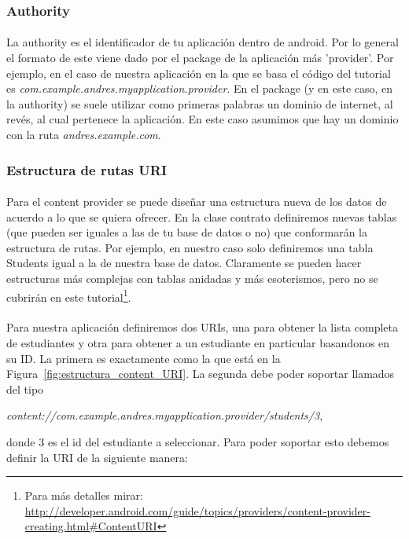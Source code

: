 \documentclass[10pt]{extarticle}
\begin{document}
\subsubsection{Authority}

\paragraph{}
La authority es el identificador de tu aplicación dentro de android. Por lo general el formato de este viene dado por el package de la aplicación más 'provider'. Por ejemplo, en el caso de nuestra aplicación en la que se basa el código del tutorial es \textit{com.example.andres.myapplication.provider}. En el package (y en este caso, en la authority) se suele utilizar como primeras palabras un dominio de internet, al revés, al cual pertenece la aplicación. En este caso asumimos que hay un dominio con la ruta \textit{andres.example.com}.

\subsubsection{Estructura de rutas URI}

\paragraph{}
Para el content provider se puede diseñar una estructura nueva de los datos de acuerdo a lo que se quiera ofrecer. En la clase contrato definiremos nuevas tablas (que pueden ser iguales a las de tu base de datos o no) que conformarán la estructura de rutas. Por ejemplo, en nuestro caso solo definiremos una tabla Students igual a la de nuestra base de datos. Claramente se pueden hacer estructuras más complejas con tablas anidadas y más esoterismos, pero no se cubrirán en este tutorial\footnote{Para más detalles mirar: \url{http://developer.android.com/guide/topics/providers/content-provider-creating.html\#ContentURI}}.

\paragraph{}
Para nuestra aplicación definiremos dos URIs, una para obtener la lista completa de estudiantes y otra para obtener a un estudiante en particular basandonos en su ID. La primera es exactamente como la que está en la Figura~\ref{fig:estructura_content_URI}. La segunda debe poder soportar llamados del tipo 
\begin{center}
\textit{content://com.example.andres.myapplication.provider/students/3},
\end{center}
donde 3 es el id del estudiante a seleccionar. Para poder soportar esto debemos definir la URI de la siguiente manera:
\end{document}
